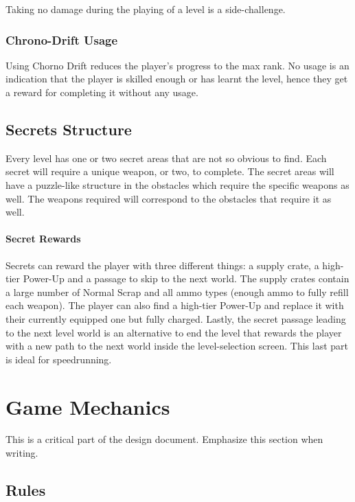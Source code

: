\documentclass[12pt]{article}
\begin{document}
Taking no damage during the playing of a level is a side-challenge. 

\subsubsection{Chrono-Drift Usage}

Using Chorno Drift reduces the player's progress to the max rank. No usage is an indication that the player is skilled enough or has learnt the level, hence they get a reward for completing it without any usage. 

\subsection{Secrets Structure}

Every level has one or two secret areas that are not so obvious to find. Each secret will require a unique weapon, or two, to complete. The secret areas will have a puzzle-like structure in the obstacles which require the specific weapons as well. The weapons required will correspond to the obstacles that require it as well. 

\paragraph{Secret Rewards}

Secrets can reward the player with three different things: a supply crate, a high-tier Power-Up and a passage to skip to the next world. The supply crates contain a large number of Normal Scrap and all ammo types (enough ammo to fully refill each weapon). The player can also find a high-tier Power-Up and replace it with their currently equipped one but fully charged. Lastly, the secret passage leading to the next level world is an alternative to end the level that rewards the player with a new path to the next world inside the level-selection screen. This last part is ideal for speedrunning. 

\section{Game Mechanics}

This is a critical part of the design document. Emphasize this section when writing.

\subsection{Rules}
\end{document}
